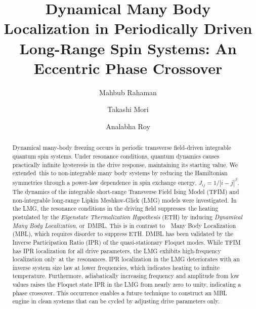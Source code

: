 \documentclass[%
reprint,
superscriptaddress,
amsmath,amssymb,
aps,
prb,
showkeys,
]{revtex4-2}
\begin{document}
	
	
	\title{Dynamical Many Body Localization in Periodically Driven Long-Range Spin Systems: An Eccentric Phase Crossover}%
	
	\author{Mahbub Rahaman}
	\author{Takashi Mori}
	\author{Analabha Roy}
	
	\begin{abstract}
		Dynamical many-body freezing occurs in periodic transverse field-driven integrable quantum spin systems. Under resonance conditions, quantum dynamics causes practically infinite hysteresis in the drive response, maintaining its starting value. We extended this to non-integrable many body systems by reducing the Hamiltonian symmetries through a power-law dependence in spin exchange energy, $J_{ij} = 1/|i-j|^{\beta}$. The dynamics of the integrable short-range Transverse Field Ising Model (TFIM) and non-integrable long-range Lipkin Meshkov-Glick (LMG) models were investigated. In the LMG, the resonance conditions in the driving field suppresses the heating postulated by the \textit{Eigenstate Thermalization Hypothesis} (ETH)		
		by inducing \textit{Dynamical Many Body Localization}, or DMBL. This is in contrast to  Many Body Localization (MBL), which requires disorder to suppress ETH. DMBL has been validated by the Inverse Participation Ratio (IPR) of the quasi-stationary Floquet modes. While TFIM has IPR localization for all drive parameters, the LMG exhibits high-frequency localization only at the resonances. IPR localization in the LMG deteriorates with an inverse system size law at lower frequencies, which indicates heating to infinite temperature. Furthermore, adiabatically increasing frequency and amplitude from low values raises the Floquet state IPR in the LMG from nearly zero to unity, indicating a phase crossover. This occurrence enables a future technique to construct an MBL engine in clean systems that can be cycled by adjusting drive parameters only.		
	\end{abstract}
	
\end{document}
